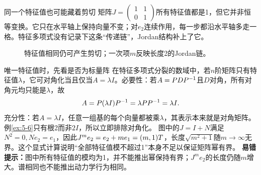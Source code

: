 \begin{insight}{同一个特征值也可能藏着剪切}
矩阵$J=\begin{pmatrix}1&1\\0&1\end{pmatrix}$所有特征值都是1，但它并非恒等变换。它只在水平轴上保持向量不变；对$e_2$连续作用，每一步都沿水平轴多走一格。特征多项式没有记录下这条“传递链”，Jordan结构补上了它。
\end{insight}
\begin{figure}[H]\centering
{}
\caption{特征值相同仍可产生剪切；一次项$m$反映长度2的Jordan链。}\label{fig:jordan-shear}
\end{figure}
\begin{clevertrick}{唯一特征值时，先看是否为标量阵}
在特征多项式分裂的数域中，若$n$阶矩阵只有特征值$\lambda$，它可对角化当且仅当$A=\lambda I$。必要性：若$A=PDP^{-1}$且$D$对角，所有对角元均只能是$\lambda$，故
\[A=P(\lambda I)P^{-1}=\lambda PP^{-1}=\lambda I.\]
充分性：若$A=\lambda I$，任意一组基的每个向量都被乘$\lambda$，其表示本来就是对角矩阵。例\ref{ex:5-6}只有根2而非$2I$，所以立即排除对角化。
图中的$J=I+N$满足$N^2=0,Ne_2=e_1$，因此$J^me_2=e_2+m e_1=(m,1)T$，长度$\sqrt{m^2+1}$随$m\to\infty$无界。这个显式计算说明“全部特征值模不超过1”本身不足以保证矩阵幂有界。
\textbf{易错提示：}图中所有特征值的模均为1，并不能推出幂保持有界；$J^m e_2$的长度仍随$m$增大。谱相同也不能推出动力学行为相同。
\end{clevertrick}
